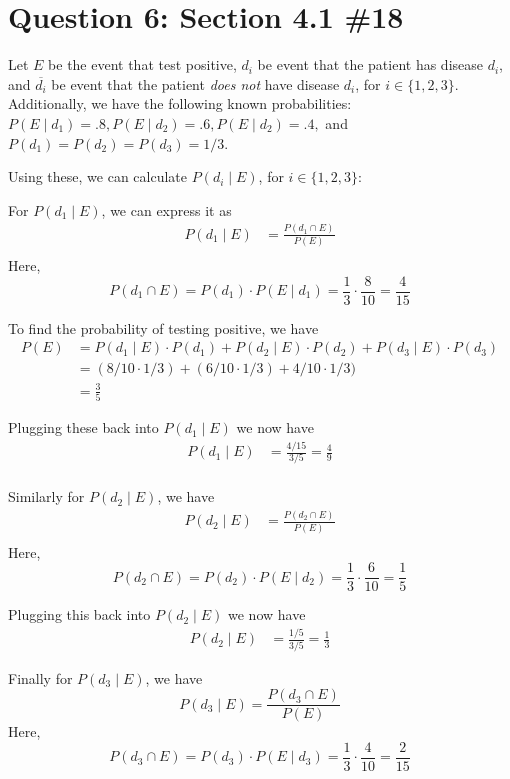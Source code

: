 \documentclass[11pt, oneside]{article}   	%
\begin{document}
\section*{Question 6: Section 4.1 \#18}

Let $E$ be the event that test positive, $d_i$ be event that the patient has disease $d_i$,  and $\overline{d_i}$ be event that the patient \textit{does not} have disease $d_i$, for $i \in \{1,2,3\}$. Additionally, we  have the following known probabilities: $P(E \mid d_1) = .8, P(E \mid d_2) = .6, P(E \mid d_2) = .4,$ and $P(d_1) = P(d_2) = P(d_3) = 1/3$. 

Using these, we can calculate $P(d_i \mid E)$, for $i \in \{1,2,3\}$:

For $P(d_1 \mid E)$, we can express it as
	\begin{align*}
	P(d_1 \mid E) & = \frac{P(d_1 \cap E)}{P(E)} \\
	\end{align*}	
Here, 
	$$ P(d_1 \cap E) = P(d_1) \cdot P(E \mid d_1) = \frac{1}{3} \cdot \frac{8}{10} = \frac{4}{15}$$
	
To find the probability of testing positive, we have
	\begin{align*}
		P(E) & = P(d_1 \mid E)\cdot P(d_1) + P(d_2 \mid E)\cdot P(d_2) + P(d_3 \mid E)\cdot P(d_3)  \\
		& = (8/10 \cdot 1/3) + (6/10 \cdot 1/3) + 4/10 \cdot 1/3) \\
		& = \frac{3}{5}
	\end{align*}


Plugging these back into $P(d_1 \mid E)$ we now have
	\begin{align*}
		P(d_1 \mid E) & = \frac{4/15}{3/5} = \frac{4}{9} \\
	\end{align*}

Similarly for $P(d_2 \mid E)$, we have
	\begin{align*}
		P(d_2 \mid E) & = \frac{P(d_2 \cap E)}{P(E)}\\
	\end{align*}
Here, 
	$$ P(d_2 \cap E) = P(d_2) \cdot P(E \mid d_2) = \frac{1}{3} \cdot \frac{6}{10} = \frac{1}{5}$$
	
Plugging this back into $P(d_2 \mid E)$ we now have
	\begin{align*}
		P(d_2 \mid E) & = \frac{1/5}{3/5} = \frac{1}{3}
	\end{align*}
	
	
Finally for $P(d_3 \mid E)$, we have
	$$P(d_3 \mid E) = \frac{P(d_3 \cap E)}{P(E)}$$
Here, 
	$$P(d_3 \cap E) = P(d_3) \cdot P(E \mid d_3) = \frac{1}{3} \cdot \frac{4}{10} = \frac{2}{15}$$
	
\end{document}
